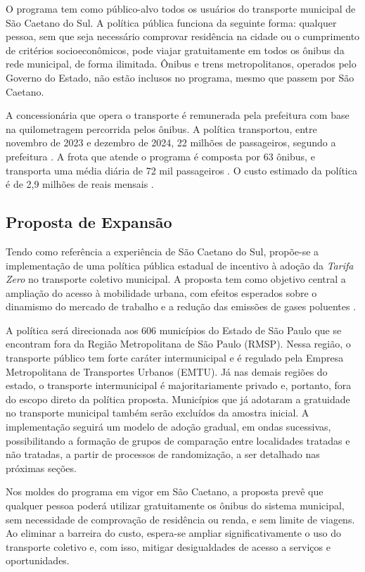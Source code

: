 O programa tem como público-alvo todos os usuários do transporte municipal de São Caetano do Sul. A política pública funciona da seguinte forma: qualquer pessoa, sem que seja necessário comprovar residência na cidade ou o cumprimento de critérios socioeconômicos, pode viajar gratuitamente em todos os ônibus da rede municipal, de forma ilimitada. Ônibus e trens metropolitanos, operados pelo Governo do Estado, não estão inclusos no programa, mesmo que passem por São Caetano.

A concessionária que opera o transporte é remunerada pela prefeitura com base na quilometragem percorrida pelos ônibus. A política transportou, entre novembro de 2023 e dezembro de 2024, 22 milhões de passageiros, segundo a prefeitura \cite{PREF_2024}. A frota que atende o programa é composta por 63 ônibus, e transporta uma média diária de 72 mil passageiros \cite{PREF_2023}. O custo estimado da política é de 2{,}9 milhões de reais mensais \cite{LEI_PROG}.

\subsection{Proposta de Expansão}

Tendo como referência a experiência de São Caetano do Sul, propõe-se a implementação de uma política pública estadual de incentivo à adoção da \textit{Tarifa Zero} no transporte coletivo municipal. A proposta tem como objetivo central a ampliação do acesso à mobilidade urbana, com efeitos esperados sobre o dinamismo do mercado de trabalho e a redução das emissões de gases poluentes \cite{BETTER_FIRMS, NO_DAM, PREF_2024}.

A política será direcionada aos 606 municípios do Estado de São Paulo que se encontram fora da Região Metropolitana de São Paulo (RMSP). Nessa região, o transporte público tem forte caráter intermunicipal e é regulado pela Empresa Metropolitana de Transportes Urbanos (EMTU). Já nas demais regiões do estado, o transporte intermunicipal é majoritariamente privado e, portanto, fora do escopo direto da política proposta. Municípios que já adotaram a gratuidade no transporte municipal também serão excluídos da amostra inicial. A implementação seguirá um modelo de adoção gradual, em ondas sucessivas, possibilitando a formação de grupos de comparação entre localidades tratadas e não tratadas, a partir de processos de randomização, a ser detalhado nas próximas seções.

Nos moldes do programa em vigor em São Caetano, a proposta prevê que qualquer pessoa poderá utilizar gratuitamente os ônibus do sistema municipal, sem necessidade de comprovação de residência ou renda, e sem limite de viagens. Ao eliminar a barreira do custo, espera-se ampliar significativamente o uso do transporte coletivo e, com isso, mitigar desigualdades de acesso a serviços e oportunidades.


